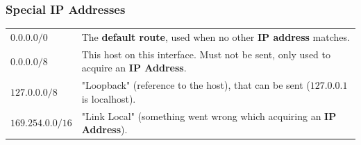 \subsubsection{Special IP Addresses}
\begin{center}
    \begin{tabular}{l p{}}
        $0.0.0.0/0$      & The \textbf{default route}, used when no other \textbf{IP address} matches.                 \\
        $0.0.0.0/8$      & This host on this interface. Must not be sent, only used to acquire an \textbf{IP Address}. \\
        $127.0.0.0/8$    & "Loopback" (reference to the host), that can be sent ($127.0.0.1$ is localhost).            \\
        $169.254.0.0/16$ & "Link Local" (something went wrong which acquiring an \textbf{IP Address}).                 \\
    \end{tabular}
\end{center}
